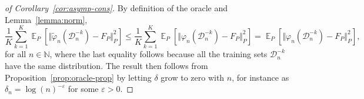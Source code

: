 \documentclass[a4paper,danish]{article}
\DeclareMathOperator{\E}{\mathbb{E}} %
\newcommand{\N}{\mathbb{N}}
\renewcommand{\phi}{\varphi}
\renewcommand{\epsilon}{\varepsilon}
\newcommand{\1}{\mathds{1}}
\newcommand{\data}{\ensuremath{\mathcal{D}}}
\theoremstyle{plain} %
\numberwithin{theorem}{section}
\theoremstyle{definition} %
\theoremstyle{remark}
\begin{document}
\begin{proof}[of Corollary~\ref{cor:asymp-cons}]
  By definition of the oracle and Lemma~\ref{lemma:norm},
  \begin{equation*}
    \frac{1}{K} \sum_{k=1}^{K} \E_{P}{\left[ \Vert \tilde{\phi}_n(\data_n^{-k}) - F_P \Vert_{P}^2
      \right]} \leq
    \frac{1}{K} \sum_{k=1}^{K}\E_{P}{\left[ \Vert
        \phi_n(\data_n^{-k}) - F_P \Vert_{P}^2
      \right]}
    =
    \E_{P}{\left[ \Vert \phi_n(\data_n^{-k}) - F_P \Vert_{P}^2
      \right]},
  \end{equation*}
  for all \( n \in \N \), where the last equality follows because all
  the training sets \( \data_n^{-k} \) have the same distribution. The
  result then follows from Proposition~\ref{prop:oracle-prop} by
  letting $\delta$ grow to zero with \( n \), for instance as
  $\delta_n = \log(n)^{-\epsilon}$ for some $\epsilon>0$.
\end{proof}





\end{document}
